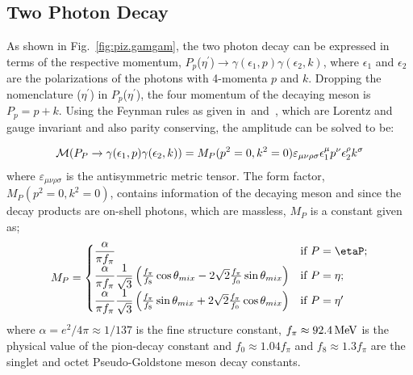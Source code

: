 \subsection{Two Photon Decay}\label{sec:piz.gg}
As shown in Fig.~\ref{fig:piz.gamgam}, the two photon decay can be expressed in terms of the respective momentum, $P_p$($\eta^{\prime}$)$\to \gamma(\epsilon_1,p) \gamma(\epsilon_2,k)$, where $\epsilon_1$ and $\epsilon_2$ are the polarizations of the photons with 4-momenta $p$ and $k$. Dropping the nomenclature ($\eta^{\prime}$) in $P_p$($\eta^{\prime}$), the four momentum of the decaying meson is $P_p= p+k$. Using the Feynman rules as given in~\cite{peskin}and~\cite{halzen}, which are Lorentz and gauge invariant and also parity conserving, the amplitude can be solved to be:

\begin{align}\label{eq:piz.gg.amp}
 {\cal M}(P_P \to \gamma(\epsilon_1,p) \gamma(\epsilon_2,k))= {M}_P(p^2=0,k^2=0) \varepsilon_{\mu\nu\rho\sigma}\epsilon_1^\mu p^\nu \epsilon_2^\rho k^\sigma
\end{align}
where $\varepsilon_{\mu\nu\rho\sigma}$ is the antisymmetric metric tensor. The form factor, ${M}_P(p^2=0,k^2=0)$, contains information of the decaying meson and since the decay products are on-shell photons, which are massless, ${M}_P$ is a constant given as;
\begin{align}\label{eq:decay.constants}
 {M}_P=\begin{cases}
         {\displaystyle\frac{\alpha}{\pi f_{\pi}}} & \mbox{if $P=\etaP$};\\
        {\displaystyle\frac{\alpha}{\pi f_\pi} \frac{1}{\sqrt{3}} }\left( \frac{f_\pi}{f_8} \cos\theta_{mix} -2\sqrt{2} \frac{f_\pi}{f_0} \sin\theta_{mix} \right)& \mbox{if $P=\eta$};\\
        {\displaystyle\frac{\alpha}{\pi f_\pi} \frac{1}{\sqrt{3}}} \left( \frac{f_\pi}{f_8} \sin\theta_{mix} +2\sqrt{2} \frac{f_\pi}{f_0} \cos\theta_{mix} \right)& \mbox{if $P=\eta'$} \,
\end{cases}
\end{align}
where $\alpha=e^2/4\pi \approx 1/137$ is the fine structure constant, $f_\pi \approx 92.4 \,{\rm MeV}$ is the physical value of the pion-decay constant and $f_0 \approx 1.04 f_\pi$ and $f_8 \approx 1.3 f_\pi$ are the singlet and octet Pseudo-Goldstone meson decay constants.

